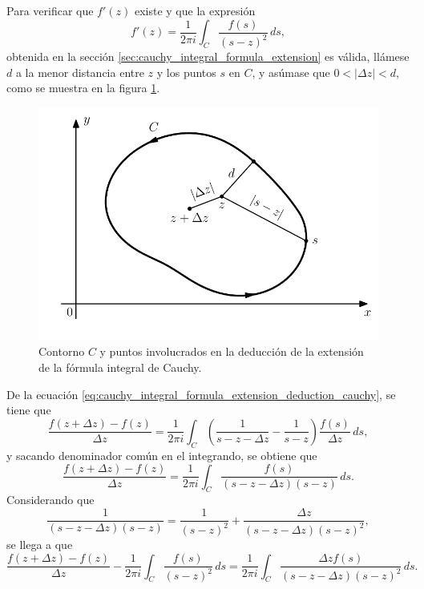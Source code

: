\documentclass[a4paper]{report}
\begin{document}
Para verificar que \(f'(z)\) existe y que la expresión 
\begin{equation}\label{eq:cauchy_integral_formula_extension_first_derivative}
 f'(z)=\frac{1}{2\pi i}\int_C\frac{f(s)}{(s-z)^2}\,ds, 
\end{equation}
obtenida en la sección \ref{sec:cauchy_integral_formula_extension} es válida, llámese \(d\) a la menor distancia entre \(z\) y los puntos \(s\) en \(C\), y asúmase que \(0<|\Delta z|<d\), como se muestra en la figura \ref{fig:cauchy_integral_formula_extension}. 
\begin{figure}[!htb]
  \begin{minipage}[c]{0.6\textwidth}
    \includegraphics[width=\textwidth]{figuras/cauchy_integral_formula_extension.pdf}
  \end{minipage}\hfill
  \begin{minipage}[c]{0.3\textwidth}
    \caption{
       Contorno \(C\) y puntos involucrados en la deducción de la extensión de la fórmula integral de Cauchy. 
    }\label{fig:cauchy_integral_formula_extension}
  \end{minipage}
\end{figure}
De la ecuación \ref{eq:cauchy_integral_formula_extension_deduction_cauchy}, se tiene que 
\[
 \frac{f(z+\Delta z)-f(z)}{\Delta z}=\frac{1}{2\pi i}\int_C\left(\frac{1}{s-z-\Delta z}-\frac{1}{s-z}\right)\frac{f(s)}{\Delta z}\,ds,
\]
y sacando denominador común en el integrando, se obtiene que 
\[
 \frac{f(z+\Delta z)-f(z)}{\Delta z}=\frac{1}{2\pi i}\int_C\frac{f(s)}{(s-z-\Delta z)(s-z)}\,ds.
\]
Considerando que 
\[
 \frac{1}{(s-z-\Delta z)(s-z)}=\frac{1}{(s-z)^2}+\frac{\Delta z}{(s-z-\Delta z)(s-z)^2},
\]
se llega a que 
\begin{equation}\label{eq:cauchy_integral_formula_extension_deduction_difference_quotient}
 \frac{f(z+\Delta z)-f(z)}{\Delta z}-\frac{1}{2\pi i}\int_C\frac{f(s)}{(s-z)^2}\,ds=\frac{1}{2\pi i}\int_C\frac{\Delta zf(s)}{(s-z-\Delta z)(s-z)^2}\,ds. 
\end{equation}
\end{document}

